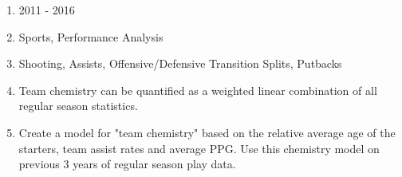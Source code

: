 \documentclass[11pt]{article}
\begin{document}
\begin{enumerate}
		\begin{enumerate}
			\item 2011 - 2016
			\item Sports, Performance Analysis
			\item Shooting, Assists, Offensive/Defensive Transition Splits, Putbacks
			\item Team chemistry can be quantified as a weighted linear combination of all regular season statistics.
			\item Create a model for "team chemistry" based on the relative average age of the starters, team assist rates and average PPG. Use this chemistry model on previous 3 years of regular season play data.
		\end{enumerate}
\end{enumerate}
\end{document}
